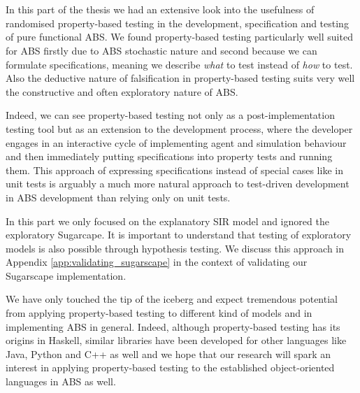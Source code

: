 \chapter*{}
In this part of the thesis we had an extensive look into the usefulness of randomised property-based testing in the development, specification and testing of pure functional ABS. We found property-based testing particularly well suited for ABS firstly due to ABS stochastic nature and second because we can formulate specifications, meaning we describe \textit{what} to test instead of \textit{how} to test. Also the deductive nature of falsification in property-based testing suits very well the constructive and often exploratory nature of ABS. 

Indeed, we can see property-based testing not only as a post-implementation testing tool but as an extension to the development process, where the developer engages in an interactive cycle of implementing agent and simulation behaviour and then immediately putting specifications into property tests and running them. This approach of expressing specifications instead of special cases like in unit tests is arguably a much more natural approach to test-driven development in ABS development than relying only on unit tests.

In this part we only focused on the explanatory SIR model and ignored the exploratory Sugarcape. It is important to understand that testing of exploratory models is also possible through hypothesis testing. We discuss this approach in Appendix \ref{app:validating_sugarscape} in the context of validating our Sugarscape implementation.

We have only touched the tip of the iceberg and expect tremendous potential from applying property-based testing to different kind of models and in implementing ABS in general. Indeed, although property-based testing has its origins in Haskell, similar libraries have been developed for other languages like Java, Python and C++ as well and we hope that our research will spark an interest in applying property-based testing to the established object-oriented languages in ABS as well.

